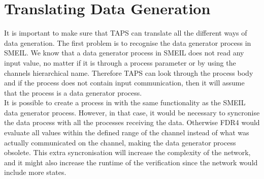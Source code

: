 \section{Translating Data Generation}
It is important to make sure that TAPS can translate all the different ways of data generation. The first problem is to recognise the data generator process in SMEIL. We know that a data generator process in SMEIL does not read any input value, no matter if it is through a process parameter or by using the channels hierarchical name. Therefore TAPS can look through the process body and if the process does not contain input communication, then it will assume that the process is a data generator process. \\

It is possible to create a process in \cspm with the same functionality as the SMEIL data generator process. However, in that case, it would be necessary to syncronise the data process with all the processes receiving the data. Otherwise FDR4 would evaluate all values within the defined range of the channel instead of what was actually communicated on the channel, making the data generator process obsolete. This extra syncronisation will increase the complexity of the \cspm{} network, and it might also increase the runtime of the verification since the \cspm{} network would include more states.

